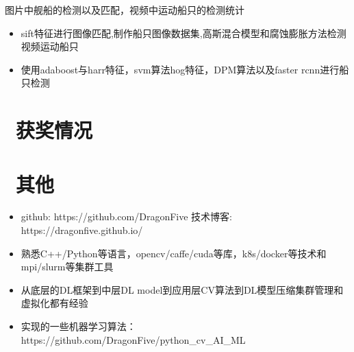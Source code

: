 \documentclass{resume}
\begin{document}
图片中舰船的检测以及匹配，视频中运动船只的检测统计
\begin{itemize}
  \item sift特征进行图像匹配,制作船只图像数据集,高斯混合模型和腐蚀膨胀方法检测视频运动船只
  \item 使用adaboost与harr特征，svm算法hog特征，DPM算法以及faster rcnn进行船只检测
\end{itemize}




\section{\faHeartO\ 获奖情况}

\section{\faInfo\ 其他}
\begin{itemize}[parsep=0.5ex]
  \item github: https://github.com/DragonFive 技术博客: https://dragonfive.github.io/  
  \item 熟悉C++/Python等语言，opencv/caffe/cuda等库，k8s/docker等技术和mpi/slurm等集群工具
  \item 从底层的DL框架到中层DL model到应用层CV算法到DL模型压缩集群管理和虚拟化都有经验
  \item 实现的一些机器学习算法：https://github.com/DragonFive/python\_cv\_AI\_ML
\end{itemize}

%
%
\end{document}
